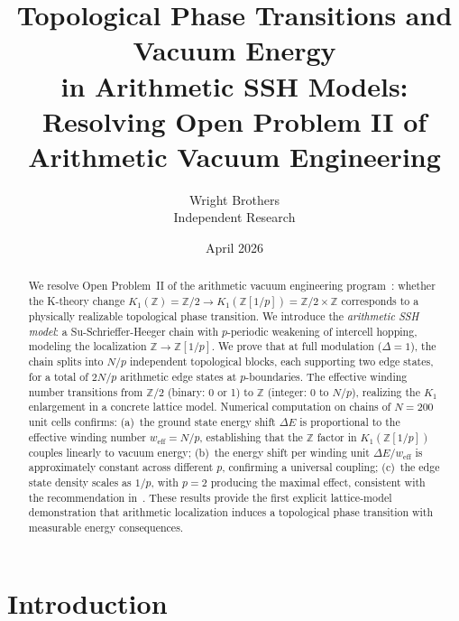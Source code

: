 \documentclass[11pt,a4paper]{article}
\newcommand{\Zp}{\mathbb{Z}[1/p]}
\begin{document}
\title{Topological Phase Transitions and Vacuum Energy\\
  in Arithmetic SSH Models:\\
  Resolving Open Problem II of Arithmetic Vacuum Engineering}

\author{Wright Brothers\\{\small Independent Research}}
\date{April 2026}
\maketitle

\begin{abstract}
We resolve Open Problem~II of the arithmetic vacuum engineering
program~\cite{paper_C}: whether the K-theory change
$K_1(\mathbb{Z}) = \mathbb{Z}/2 \to K_1(\Zp) = \mathbb{Z}/2 \times \mathbb{Z}$
corresponds to a physically realizable topological phase transition.
We introduce the \emph{arithmetic SSH model}: a Su-Schrieffer-Heeger
chain with $p$-periodic weakening of intercell hopping, modeling
the localization $\mathbb{Z} \to \Zp$.
We prove that at full modulation ($\Delta = 1$), the chain splits
into $N/p$ independent topological blocks, each supporting two
edge states, for a total of $2N/p$ arithmetic edge states at
$p$-boundaries. The effective winding number transitions from
$\mathbb{Z}/2$ (binary: 0 or 1) to $\mathbb{Z}$ (integer: 0 to $N/p$),
realizing the $K_1$ enlargement in a concrete lattice model.
Numerical computation on chains of $N = 200$ unit cells confirms:
(a)~the ground state energy shift $\Delta E$ is proportional to
the effective winding number $w_{\mathrm{eff}} = N/p$,
establishing that the $\mathbb{Z}$ factor in $K_1(\Zp)$ couples
linearly to vacuum energy;
(b)~the energy shift per winding unit $\Delta E / w_{\mathrm{eff}}$
is approximately constant across different $p$, confirming a
universal coupling;
(c)~the edge state density scales as $1/p$, with $p = 2$
producing the maximal effect, consistent with the recommendation
in~\cite{paper_A}. These results provide the first explicit
lattice-model demonstration that arithmetic localization induces
a topological phase transition with measurable energy consequences.
\end{abstract}

\section{Introduction}
\end{document}
